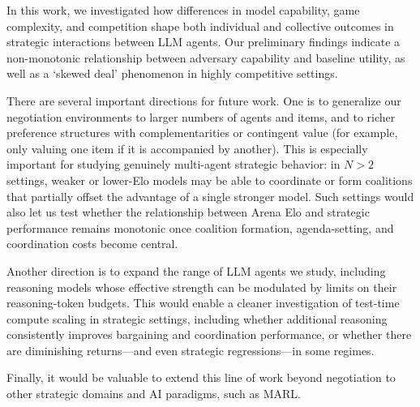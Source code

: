 In this work, we investigated how differences in model capability, game complexity, and competition shape both individual and collective outcomes in strategic interactions between LLM agents.
Our preliminary findings indicate a non-monotonic relationship between adversary capability and baseline utility, as well as a `skewed deal' phenomenon in highly competitive settings.

There are several important directions for future work.
One is to generalize our negotiation environments to larger numbers of agents and items, and to richer preference structures with complementarities or contingent value (for example, only valuing one item if it is accompanied by another).
This is especially important for studying genuinely multi-agent strategic behavior: in $N > 2$ settings, weaker or lower-Elo models may be able to coordinate or form coalitions that partially offset the advantage of a single stronger model.
Such settings would also let us test whether the relationship between Arena Elo and strategic performance remains monotonic once coalition formation, agenda-setting, and coordination costs become central.

Another direction is to expand the range of LLM agents we study, including reasoning models whose effective strength can be modulated by limits on their reasoning-token budgets.
This would enable a cleaner investigation of test-time compute scaling in strategic settings, including whether additional reasoning consistently improves bargaining and coordination performance, or whether there are diminishing returns---and even strategic regressions---in some regimes.

Finally, it would be valuable to extend this line of work beyond negotiation to other strategic domains and AI paradigms, such as MARL.

